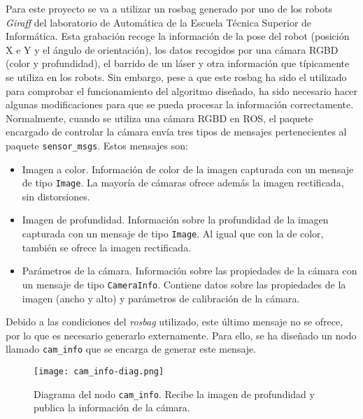 Para este proyecto se va a utilizar un rosbag generado por uno de los robots \textit{Giraff} del laboratorio de Automática de la Escuela Técnica Superior de Informática. Esta grabación recoge la información de la pose del robot (posición X e Y y el ángulo de orientación), los datos recogidos por una cámara RGBD (color y profundidad), el barrido de un láser y otra información que típicamente se utiliza en los robots. Sin embargo, pese a que este rosbag ha sido el utilizado para comprobar el funcionamiento del algoritmo diseñado, ha sido necesario hacer algunas modificaciones para que se pueda procesar la información correctamente.\\

Normalmente, cuando se utiliza una cámara RGBD en ROS, el paquete encargado de controlar la cámara envía tres tipos de mensajes pertenecientes al paquete \texttt{sensor\_msgs}. Estos mensajes son:

\begin{itemize}

	\item Imagen a color. Información de color de la imagen capturada con un mensaje de tipo \texttt{Image}. La mayoría de cámaras ofrece además la imagen rectificada, sin distorsiones.
	\item Imagen de profundidad. Información sobre la profundidad de la imagen capturada con un mensaje de tipo \texttt{Image}. Al igual que con la de color, también se ofrece la imagen rectificada.
	\item Parámetros de la cámara. Información sobre las propiedades de la cámara con un mensaje de tipo \texttt{CameraInfo}. Contiene datos sobre las propiedades de la imagen (ancho y alto) y parámetros de calibración de la cámara.

\end{itemize}

Debido a las condiciones del \textit{rosbag} utilizado, este último mensaje no se ofrece, por lo que es necesario generarlo externamente. Para ello, se ha diseñado un nodo llamado \texttt{cam\_info} que se encarga de generar este mensaje.\\

\begin{figure}[h]
	\begin{center} 
		\texttt{[image: cam\_info-diag.png]}
	\end{center}
	\caption{Diagrama del nodo \texttt{cam\_info}. Recibe la imagen de profundidad y publica la información de la cámara.}
	\label{fig:cam_info}
\end{figure}

